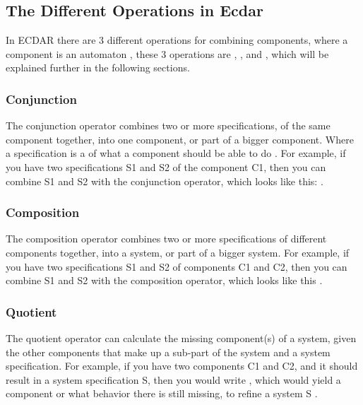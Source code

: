 \subsection{The Different Operations in Ecdar} \label{RevaeelOperations}
In ECDAR there are 3 different operations for combining components, where a component is an automaton \cite{ecdartheory}, these 3 operations are , , and , which will be explained further in the following sections.

\subsubsection*{Conjunction} \label{The-Different-Operations-In-Ecdar:Conjunction}
The conjunction operator combines two or more specifications, of the same component together, into one component, or part of a bigger component. 
Where a specification is a  of what a component should be able to do \cite{ecdartheory}.
For example, if you have two specifications S1 and S2 of the component C1, then you can combine S1 and S2 with the conjunction operator, which looks like this:  \cite{goorden_specification_2022}.
 
\subsubsection*{Composition} \label{The-Different-Operations-In-Ecdar:Composition}
The composition operator combines two or more specifications of different components together, into a system, or part of a bigger system.
For example, if you have two specifications S1 and S2 of components C1 and C2, then you can combine S1 and S2 with the composition operator, which looks like this  \cite{goorden_specification_2022}.

\subsubsection*{Quotient} \label{The-Different-Operations-In-Ecdar:Quotient}
The quotient operator can calculate the missing component(s) of a system, given the other components that make up a sub-part of the system and a system specification. For example, if you have two components C1 and C2, and it should result in a system specification S, then you would write , which would yield a component or what behavior there is still missing, to refine a system S \cite{goorden_specification_2022}.